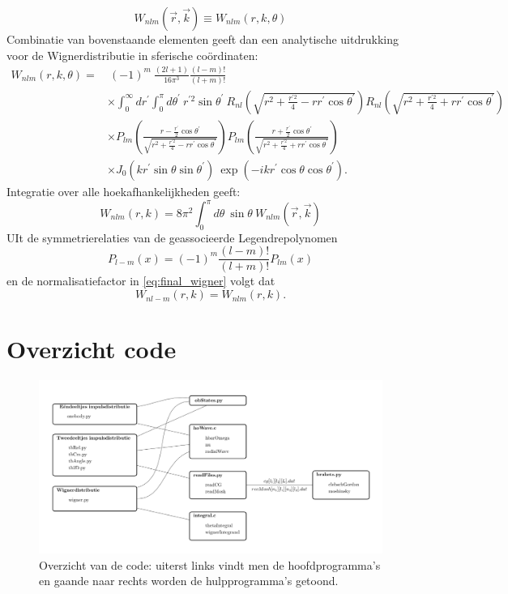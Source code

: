 \documentclass[11pt,twoside]{book}
\begin{document}
\begin{equation}
W_{nlm}(\vec{r},\vec{k}) \equiv W_{nlm}(r,k, \theta)
\end{equation}
Combinatie van bovenstaande elementen geeft dan een analytische uitdrukking voor de Wignerdistributie in sferische co\"{o}rdinaten:
\begin{align} \label{eq:final_wigner}
 W_{nlm}(r,k, \theta) = & \ (-1)^m \ \frac{(2l+1)}{16\pi^3}\frac{(l-m)!}{(l+m)!} & \nonumber \\ 
 & \times  \int^\infty_0 dr^\prime \int^\pi_0 d\theta^{\prime} \  r^{\prime 2} \sin \theta^\prime  \ R_{nl}\left(\sqrt{r^2+ \frac{r^{\prime 2}}{4} - r r^\prime \cos{\theta^\prime} }\right) R_{nl}\left(\sqrt{r^2+ \frac{r^{\prime 2}}{4} + r r^\prime  \cos{\theta^\prime}}\right) & \nonumber \\ 
 & \times P_{lm}\left(\frac{r - \frac{r^\prime}{2}\cos \theta^\prime}{\sqrt{r^2+ \frac{r^{\prime 2}}{4} - r r^\prime \cos{\theta^\prime}}} \right) P_{lm}\left(\frac{r + \frac{r^\prime}{2}\cos \theta^\prime}{\sqrt{r^2+ \frac{r^{\prime 2}}{4} + r r^\prime  \cos{\theta^\prime}}} \right) & \nonumber 
\\  & \times J_0(kr^\prime \sin \theta \sin \theta^\prime)\  \exp{(-ikr^\prime \cos \theta \cos \theta^\prime)}. & 
\end{align}
Integratie over alle hoekafhankelijkheden geeft:
\begin{equation} \label{eq:final_wigner2}
 W_{nlm}(r,k) = 8 \pi^2 \int^\pi_0 d\theta \ \sin \theta \ W_{nlm}(\vec{r},\vec{k})
\end{equation}
UIt de symmetrierelaties van de geassocieerde Legendrepolynomen 
\begin{equation}
P_{l-m}(x) = (-1)^m \frac{(l-m)!}{(l+m)!}  P_{lm}(x)
\end{equation}
en de normalisatiefactor in \eqref{eq:final_wigner} volgt dat
\begin{equation}
W_{nl-m}(r,k) = W_{nlm}(r,k).
\end{equation} 

\chapter{Overzicht code }

\begin{figure} 
\centering
\includegraphics[scale=0.5]{./figuren/code_overview.png}
\caption{Overzicht van de code: uiterst links vindt men de hoofdprogramma's en gaande naar rechts worden de hulpprogramma's getoond.}
\label{fig:overzicht}
\end{figure}
\end{document}

